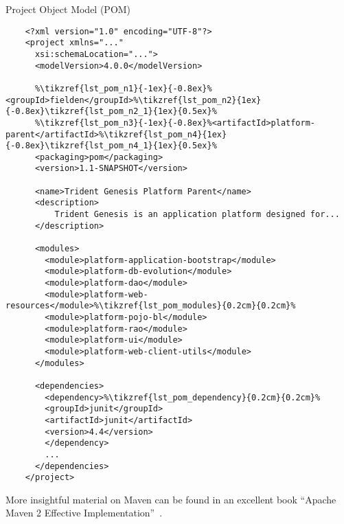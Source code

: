   \begin{code}{Project Object Model (POM)}{\label{lst:pom}}
    \begin{lstlisting}
    <?xml version="1.0" encoding="UTF-8"?>
    <project xmlns="..."
	  xsi:schemaLocation="...">
	  <modelVersion>4.0.0</modelVersion>

	  %\tikzref{lst_pom_n1}{-1ex}{-0.8ex}%<groupId>fielden</groupId>%\tikzref{lst_pom_n2}{1ex}{-0.8ex}\tikzref{lst_pom_n2_1}{1ex}{0.5ex}%
	  %\tikzref{lst_pom_n3}{-1ex}{-0.8ex}%<artifactId>platform-parent</artifactId>%\tikzref{lst_pom_n4}{1ex}{-0.8ex}\tikzref{lst_pom_n4_1}{1ex}{0.5ex}%
	  <packaging>pom</packaging>
	  <version>1.1-SNAPSHOT</version>

	  <name>Trident Genesis Platform Parent</name>
	  <description>
	      Trident Genesis is an application platform designed for...
	  </description>

	  <modules>
		<module>platform-application-bootstrap</module>
		<module>platform-db-evolution</module>
		<module>platform-dao</module>
		<module>platform-web-resources</module>%\tikzref{lst_pom_modules}{0.2cm}{0.2cm}%
		<module>platform-pojo-bl</module>
		<module>platform-rao</module>
		<module>platform-ui</module>
		<module>platform-web-client-utils</module>
	  </modules>

	  <dependencies>
	    <dependency>%\tikzref{lst_pom_dependency}{0.2cm}{0.2cm}%
		<groupId>junit</groupId>
		<artifactId>junit</artifactId>
		<version>4.4</version>
	    </dependency>
	    ...
	  </dependencies>
    </project> 
    \end{lstlisting}


  
    \vspace*{-40pt}
  \end{code}

  More insightful material on Maven can be found in an excellent book ``Apache Maven 2 Effective Implementation''~\cite{PoCh2009}.